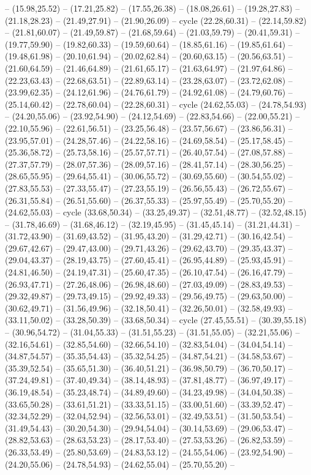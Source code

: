 {-- (15.98,25.52) -- (17.21,25.82) -- (17.55,26.38) -- (18.08,26.61) -- (19.28,27.83) -- (21.18,28.23) -- (21.49,27.91) -- (21.90,26.09) -- cycle (22.28,60.31) -- (22.14,59.82) -- (21.81,60.07) -- (21.49,59.87) -- (21.68,59.64) -- (21.03,59.79) -- (20.41,59.31) -- (19.77,59.90) -- (19.82,60.33) -- (19.59,60.64) -- (18.85,61.16) -- (19.85,61.64) -- (19.48,61.98) -- (20.10,61.94) -- (20.02,62.84) -- (20.60,63.15) -- (20.56,63.51) -- (21.60,64.59) -- (21.46,64.89) -- (21.61,65.17) -- (21.63,64.97) -- (21.97,64.86) -- (22.23,63.43) -- (22.68,63.51) -- (22.89,63.14) -- (23.28,63.07) -- (23.72,62.08) -- (23.99,62.35) -- (24.12,61.96) -- (24.76,61.79) -- (24.92,61.08) -- (24.79,60.76) -- (25.14,60.42) -- (22.78,60.04) -- (22.28,60.31) -- cycle (24.62,55.03) -- (24.78,54.93) -- (24.20,55.06) -- (23.92,54.90) -- (24.12,54.69) -- (22.83,54.66) -- (22.00,55.21) -- (22.10,55.96) -- (22.61,56.51) -- (23.25,56.48) -- (23.57,56.67) -- (23.86,56.31) -- (23.95,57.01) -- (24.28,57.46) -- (24.22,58.16) -- (24.69,58.54) -- (25.17,58.45) -- (25.36,58.72) -- (25.73,58.16) -- (25.57,57.71) -- (26.40,57.54) -- (27.08,57.88) -- (27.37,57.79) -- (28.07,57.36) -- (28.09,57.16) -- (28.41,57.14) -- (28.30,56.25) -- (28.65,55.95) -- (29.64,55.41) -- (30.06,55.72) -- (30.69,55.60) -- (30.54,55.02) -- (27.83,55.53) -- (27.33,55.47) -- (27.23,55.19) -- (26.56,55.43) -- (26.72,55.67) -- (26.31,55.84) -- (26.51,55.60) -- (26.37,55.33) -- (25.97,55.49) -- (25.70,55.20) -- (24.62,55.03) -- cycle (33.68,50.34) -- (33.25,49.37) -- (32.51,48.77) -- (32.52,48.15) -- (31.78,46.69) -- (31.68,46.12) -- (32.19,45.95) -- (31.45,45.14) -- (31.21,44.31) -- (31.72,43.90) -- (31.69,43.52) -- (31.95,43.20) -- (31.29,42.71) -- (30.16,42.54) -- (29.67,42.67) -- (29.47,43.00) -- (29.71,43.26) -- (29.62,43.70) -- (29.35,43.37) -- (29.04,43.37) -- (28.19,43.75) -- (27.60,45.41) -- (26.95,44.89) -- (25.93,45.91) -- (24.81,46.50) -- (24.19,47.31) -- (25.60,47.35) -- (26.10,47.54) -- (26.16,47.79) -- (26.93,47.71) -- (27.26,48.06) -- (26.98,48.60) -- (27.03,49.09) -- (28.83,49.53) -- (29.32,49.87) -- (29.73,49.15) -- (29.92,49.33) -- (29.56,49.75) -- (29.63,50.00) -- (30.62,49.71) -- (31.56,49.96) -- (32.18,50.41) -- (32.26,50.01) -- (32.58,49.93) -- (33.11,50.02) -- (33.28,50.39) -- (33.68,50.34) -- cycle (27.45,55.51) -- (30.39,55.18) -- (30.96,54.72) -- (31.04,55.33) -- (31.51,55.23) -- (31.51,55.05) -- (32.21,55.06) -- (32.16,54.61) -- (32.85,54.60) -- (32.66,54.10) -- (32.83,54.04) -- (34.04,54.14) -- (34.87,54.57) -- (35.35,54.43) -- (35.32,54.25) -- (34.87,54.21) -- (34.58,53.67) -- (35.39,52.54) -- (35.65,51.30) -- (36.40,51.21) -- (36.98,50.79) -- (36.70,50.17) -- (37.24,49.81) -- (37.40,49.34) -- (38.14,48.93) -- (37.81,48.77) -- (36.97,49.17) -- (36.19,48.54) -- (35.23,48.74) -- (34.89,49.60) -- (34.23,49.98) -- (34.04,50.38) -- (33.65,50.28) -- (33.61,51.21) -- (33.33,51.15) -- (33.00,51.60) -- (33.39,52.47) -- (32.34,52.29) -- (32.04,52.94) -- (32.56,53.01) -- (32.49,53.51) -- (31.50,53.54) -- (31.49,54.43) -- (30.20,54.30) -- (29.94,54.04) -- (30.14,53.69) -- (29.06,53.47) -- (28.82,53.63) -- (28.63,53.23) -- (28.17,53.40) -- (27.53,53.26) -- (26.82,53.59) -- (26.33,53.49) -- (25.80,53.69) -- (24.83,53.12) -- (24.55,54.06) -- (23.92,54.90) -- (24.20,55.06) -- (24.78,54.93) -- (24.62,55.04) -- (25.70,55.20) -- }
